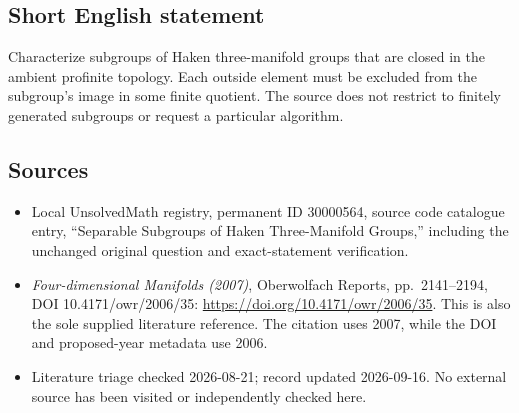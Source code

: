 \documentclass[11pt]{article}
\begin{document}
\subsection{Short English statement}
Characterize subgroups of Haken three-manifold groups that are closed in the ambient profinite topology. Each outside element must be excluded from the subgroup's image in some finite quotient. The source does not restrict to finitely generated subgroups or request a particular algorithm.
\subsection{Sources}
\begin{itemize}
\item Local UnsolvedMath registry, permanent ID 30000564, source code catalogue entry, ``Separable Subgroups of Haken Three-Manifold Groups,'' including the unchanged original question and exact-statement verification.
\item \emph{Four-dimensional Manifolds (2007)}, Oberwolfach Reports, pp.\ 2141--2194, DOI 10.4171/owr/2006/35: \url{https://doi.org/10.4171/owr/2006/35}. This is also the sole supplied literature reference. The citation uses 2007, while the DOI and proposed-year metadata use 2006.
\item Literature triage checked 2026-08-21; record updated 2026-09-16. No external source has been visited or independently checked here.
\end{itemize}
\end{document}
